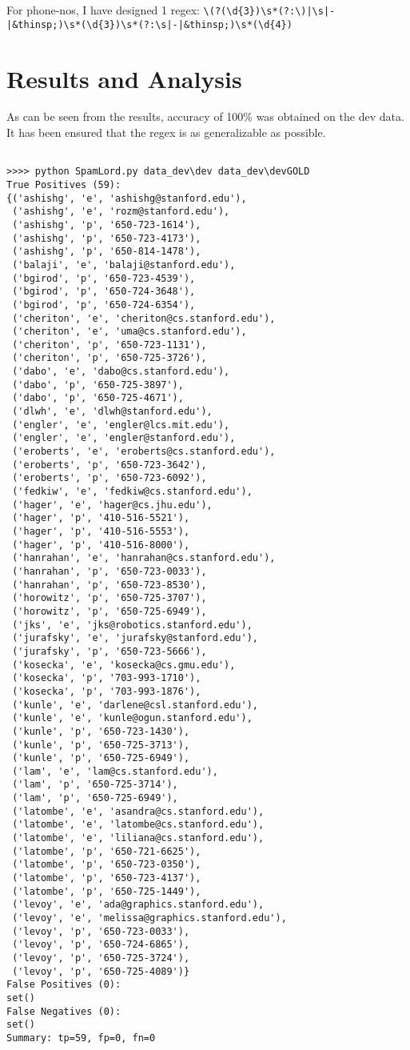 \documentclass{article}
\begin{document}
For phone-nos, I have designed 1 regex:\newline
\verb§\(?(\d{3})\s*(?:\)|\s|-|&thinsp;)\s*(\d{3})\s*(?:\s|-|&thinsp;)\s*(\d{4})§
\section{Results and Analysis}
As can be seen from the results, accuracy of 100\% was obtained on the dev data. It has been ensured that the regex is as generalizable as possible. 
\begin{verbatim}

>>>> python SpamLord.py data_dev\dev data_dev\devGOLD
True Positives (59):
{('ashishg', 'e', 'ashishg@stanford.edu'),
 ('ashishg', 'e', 'rozm@stanford.edu'),
 ('ashishg', 'p', '650-723-1614'),
 ('ashishg', 'p', '650-723-4173'),
 ('ashishg', 'p', '650-814-1478'),
 ('balaji', 'e', 'balaji@stanford.edu'),
 ('bgirod', 'p', '650-723-4539'),
 ('bgirod', 'p', '650-724-3648'),
 ('bgirod', 'p', '650-724-6354'),
 ('cheriton', 'e', 'cheriton@cs.stanford.edu'),
 ('cheriton', 'e', 'uma@cs.stanford.edu'),
 ('cheriton', 'p', '650-723-1131'),
 ('cheriton', 'p', '650-725-3726'),
 ('dabo', 'e', 'dabo@cs.stanford.edu'),
 ('dabo', 'p', '650-725-3897'),
 ('dabo', 'p', '650-725-4671'),
 ('dlwh', 'e', 'dlwh@stanford.edu'),
 ('engler', 'e', 'engler@lcs.mit.edu'),
 ('engler', 'e', 'engler@stanford.edu'),
 ('eroberts', 'e', 'eroberts@cs.stanford.edu'),
 ('eroberts', 'p', '650-723-3642'),
 ('eroberts', 'p', '650-723-6092'),
 ('fedkiw', 'e', 'fedkiw@cs.stanford.edu'),
 ('hager', 'e', 'hager@cs.jhu.edu'),
 ('hager', 'p', '410-516-5521'),
 ('hager', 'p', '410-516-5553'),
 ('hager', 'p', '410-516-8000'),
 ('hanrahan', 'e', 'hanrahan@cs.stanford.edu'),
 ('hanrahan', 'p', '650-723-0033'),
 ('hanrahan', 'p', '650-723-8530'),
 ('horowitz', 'p', '650-725-3707'),
 ('horowitz', 'p', '650-725-6949'),
 ('jks', 'e', 'jks@robotics.stanford.edu'),
 ('jurafsky', 'e', 'jurafsky@stanford.edu'),
 ('jurafsky', 'p', '650-723-5666'),
 ('kosecka', 'e', 'kosecka@cs.gmu.edu'),
 ('kosecka', 'p', '703-993-1710'),
 ('kosecka', 'p', '703-993-1876'),
 ('kunle', 'e', 'darlene@csl.stanford.edu'),
 ('kunle', 'e', 'kunle@ogun.stanford.edu'),
 ('kunle', 'p', '650-723-1430'),
 ('kunle', 'p', '650-725-3713'),
 ('kunle', 'p', '650-725-6949'),
 ('lam', 'e', 'lam@cs.stanford.edu'),
 ('lam', 'p', '650-725-3714'),
 ('lam', 'p', '650-725-6949'),
 ('latombe', 'e', 'asandra@cs.stanford.edu'),
 ('latombe', 'e', 'latombe@cs.stanford.edu'),
 ('latombe', 'e', 'liliana@cs.stanford.edu'),
 ('latombe', 'p', '650-721-6625'),
 ('latombe', 'p', '650-723-0350'),
 ('latombe', 'p', '650-723-4137'),
 ('latombe', 'p', '650-725-1449'),
 ('levoy', 'e', 'ada@graphics.stanford.edu'),
 ('levoy', 'e', 'melissa@graphics.stanford.edu'),
 ('levoy', 'p', '650-723-0033'),
 ('levoy', 'p', '650-724-6865'),
 ('levoy', 'p', '650-725-3724'),
 ('levoy', 'p', '650-725-4089')}
False Positives (0):
set()
False Negatives (0):
set()
Summary: tp=59, fp=0, fn=0  
\end{verbatim}
\end{document}
